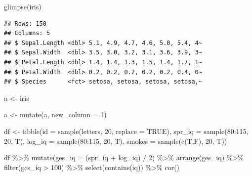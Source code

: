 \documentclass[
]{book}
\newenvironment{Shaded}{\begin{snugshade}}{\end{snugshade}}
\newcommand{\AttributeTok}[1]{\textcolor[rgb]{0.77,0.63,0.00}{#1}}
\newcommand{\ConstantTok}[1]{\textcolor[rgb]{0.00,0.00,0.00}{#1}}
\newcommand{\DecValTok}[1]{\textcolor[rgb]{0.00,0.00,0.81}{#1}}
\newcommand{\FunctionTok}[1]{\textcolor[rgb]{0.00,0.00,0.00}{#1}}
\newcommand{\NormalTok}[1]{#1}
\newcommand{\OtherTok}[1]{\textcolor[rgb]{0.56,0.35,0.01}{#1}}
\newcommand{\SpecialCharTok}[1]{\textcolor[rgb]{0.00,0.00,0.00}{#1}}
\newcommand{\StringTok}[1]{\textcolor[rgb]{0.31,0.60,0.02}{#1}}
\begin{document}
\begin{Shaded}
\begin{Highlighting}[]
\FunctionTok{glimpse}\NormalTok{(iris)}
\end{Highlighting}
\end{Shaded}

\begin{verbatim}
## Rows: 150
## Columns: 5
## $ Sepal.Length <dbl> 5.1, 4.9, 4.7, 4.6, 5.0, 5.4, 4~
## $ Sepal.Width  <dbl> 3.5, 3.0, 3.2, 3.1, 3.6, 3.9, 3~
## $ Petal.Length <dbl> 1.4, 1.4, 1.3, 1.5, 1.4, 1.7, 1~
## $ Petal.Width  <dbl> 0.2, 0.2, 0.2, 0.2, 0.2, 0.4, 0~
## $ Species      <fct> setosa, setosa, setosa, setosa,~
\end{verbatim}

\begin{Shaded}
\begin{Highlighting}[]
\NormalTok{a }\OtherTok{\textless{}{-}}\NormalTok{ iris}

\NormalTok{a }\OtherTok{\textless{}{-}} \FunctionTok{mutate}\NormalTok{(a, }\AttributeTok{new\_column =} \DecValTok{1}\NormalTok{)}


\NormalTok{df }\OtherTok{\textless{}{-}} \FunctionTok{tibble}\NormalTok{(}\AttributeTok{id =} \FunctionTok{sample}\NormalTok{(letters, }\DecValTok{20}\NormalTok{, }\AttributeTok{replace =} \ConstantTok{TRUE}\NormalTok{),}
             \AttributeTok{spr\_iq =} \FunctionTok{sample}\NormalTok{(}\DecValTok{80}\SpecialCharTok{:}\DecValTok{115}\NormalTok{, }\DecValTok{20}\NormalTok{, T),}
             \AttributeTok{log\_iq =} \FunctionTok{sample}\NormalTok{(}\DecValTok{80}\SpecialCharTok{:}\DecValTok{115}\NormalTok{, }\DecValTok{20}\NormalTok{, T),}
             \AttributeTok{smokes =} \FunctionTok{sample}\NormalTok{(}\FunctionTok{c}\NormalTok{(T,F), }\DecValTok{20}\NormalTok{, T))}

\NormalTok{df }\SpecialCharTok{\%\textgreater{}\%} 
  \FunctionTok{mutate}\NormalTok{(}\AttributeTok{ges\_iq =}\NormalTok{ (spr\_iq }\SpecialCharTok{+}\NormalTok{ log\_iq) }\SpecialCharTok{/} \DecValTok{2}\NormalTok{) }\SpecialCharTok{\%\textgreater{}\%} 
  \FunctionTok{arrange}\NormalTok{(ges\_iq) }\SpecialCharTok{\%\textgreater{}\%} 
  \FunctionTok{filter}\NormalTok{(ges\_iq }\SpecialCharTok{\textgreater{}} \DecValTok{100}\NormalTok{) }\SpecialCharTok{\%\textgreater{}\%} 
  \FunctionTok{select}\NormalTok{(}\FunctionTok{contains}\NormalTok{(}\StringTok{\textquotesingle{}iq\textquotesingle{}}\NormalTok{)) }\SpecialCharTok{\%\textgreater{}\%} 
  \FunctionTok{cor}\NormalTok{()}
\end{Highlighting}
\end{Shaded}
\end{document}
